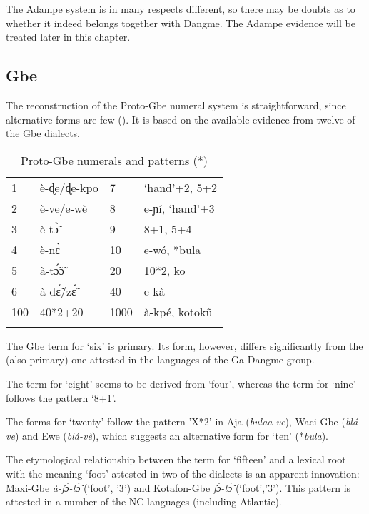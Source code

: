 The Adampe system is in many respects different, so there may be doubts as to whether it indeed belongs together with Dangme. The Adampe evidence will be treated later in this chapter.

\clearpage
\subsection{Gbe}%
The reconstruction of the Proto-Gbe numeral system is straightforward, since alternative forms are few (). It is based on the available evidence from twelve of the Gbe dialects.

\begin{table}
\caption{\label{tab:3:66}Proto-Gbe numerals and patterns (*)}


\begin{tabularx}{\textwidth}{lXlX}
\lsptoprule

1 & è-ɖe/ɖe-kpo & 7 & ‘hand’+2, 5+2\\
2 & è-ve/e-wè & 8 & e-ɲí, ‘hand’+3\\
3 & è-t{\`{\~ɔ}} & 9 & 8+1, 5+4 \\
4 & è-n{\`{ɛ}} & 10 & e-wó, *bula\\
5 & à-t{\'{\~ɔ}}{\~{ɔ}} & 20 & 10*2, ko\\
6 & à-d{\'{\~ɛ}}/z{\'{\~ɛ}} & 40 & e-kà\\
100 & 40*2+20 & 1000 & à-kpé, kotok{\~{u}}\\
\lspbottomrule
\end{tabularx}
\end{table}

The Gbe term for ‘six’ is primary. Its form, however, differs significantly from the (also primary) one attested in the languages of the Ga-Dangme group.

The term for ‘eight’ seems to be derived from ‘four’, whereas the term for ‘nine’ follows the pattern ‘8+1’.

The forms for ‘twenty’ follow the pattern ’X*2’ in Aja (\textit{bulaa-ve}), Waci-Gbe (\textit{blá-ve}) and Ewe (\textit{blá-vè}), which suggests an alternative form for ‘ten’ (*\textit{bula}).

The etymological relationship between the term for ‘fifteen’ and a lexical root with the meaning ‘foot’ attested in two of the dialects is an apparent innovation: Maxi-Gbe \textit{à-f{\`{ɔ}}-t{\'{\~ɔ}}} (‘foot’, ’3’) and Kotafon-Gbe \textit{f{\'{ɔ}}-t{\`{\~ɔ}}} (‘foot’,’3’). This pattern is attested in a number of the NC languages (including Atlantic). 

